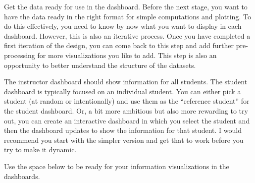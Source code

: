 \documentclass[
]{article}
\begin{document}
Get the data ready for use in the dashboard. Before the next stage, you
want to have the data ready in the right format for simple computations
and plotting. To do this effectively, you need to know by now what you
want to display in each dashboard. However, this is also an iterative
process. Once you have completed a first iteration of the design, you
can come back to this step and add further pre-processing for more
visualizations you like to add. This step is also an opportunity to
better understand the structure of the datasets.

The instructor dashboard should show information for all students. The
student dashboard is typically focused on an individual student. You can
either pick a student (at random or intentionally) and use them as the
``reference student'' for the student dashboard. Or, a bit more
ambitious but also more rewarding to try out, you can create an
interactive dashboard in which you select the student and then the
dashboard updates to show the information for that student. I would
recommend you start with the simpler version and get that to work before
you try to make it dynamic.

Use the space below to be ready for your information visualizations in
the dashboards.
\end{document}
